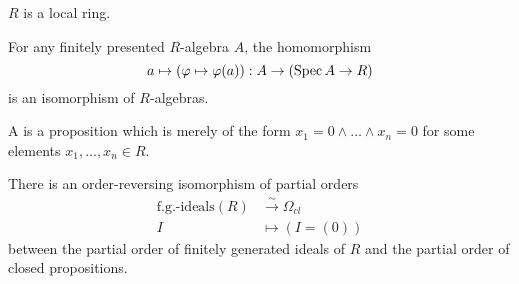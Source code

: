 \documentclass{zariski}
\begin{document}
\begin{axiom}[Loc]%
  \label{loc}
  $R$ is a local ring.
\end{axiom}

\begin{axiom}[SQC]%
  \label{sqc}
  For any finitely presented $R$-algebra $A$, the homomorphism
  \[ a \mapsto (\varphi\mapsto \varphi(a)) : A \to (\operatorname{Spec} A \to R)\]
  is an isomorphism of $R$-algebras.
\end{axiom}


\begin{definition}
  A  is a proposition
  which is merely of the form $x_1 = 0 \land \dots \land x_n = 0$
  for some elements $x_1, \dots, x_n \in R$.
\end{definition}

\begin{proposition}
  There is an order-reversing isomorphism of partial orders
  \begin{align*}
    \text{f.g.-ideals}(R) &\xrightarrow{{\sim}} \Omega_{cl} \\
    I &\mapsto (I = (0))
  \end{align*}
  between the partial order of finitely generated ideals of $R$
  and the partial order of closed propositions.
\end{proposition}
\end{document}
